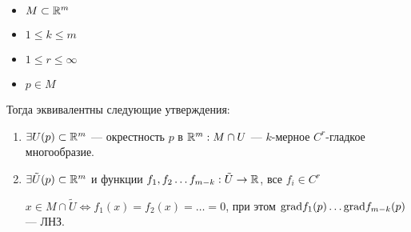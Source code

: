 \begin{theorem}\itemfix
    \begin{itemize}
        \item $M\subset \mathbb{R}^m$
        \item $1\le k\le m$
        \item $1\le r\le\infty$
        \item $p\in M$
    \end{itemize}

    Тогда эквивалентны следующие утверждения:
    \begin{enumerate}
        \item $\exists U(p) \subset\mathbb{R}^m$ --- окрестность $p$ в $\mathbb{R}^m : M\cap U$ --- $k$-мерное $C^r$-гладкое многообразие.
        \item $\exists \tilde U(p)\subset \mathbb{R}^m$ и функции $f_1, f_2\ldots f_{m-k} : \tilde U\to\mathbb{R}$, все $f_i\in C^r$

              $x\in M \cap \tilde U \Leftrightarrow f_1(x)=f_2(x)=\ldots=0$, при этом $\text{grad} f_1(p)\ldots \text{grad} f_{m-k}(p)$ --- ЛНЗ.
    \end{enumerate}
\end{theorem}
